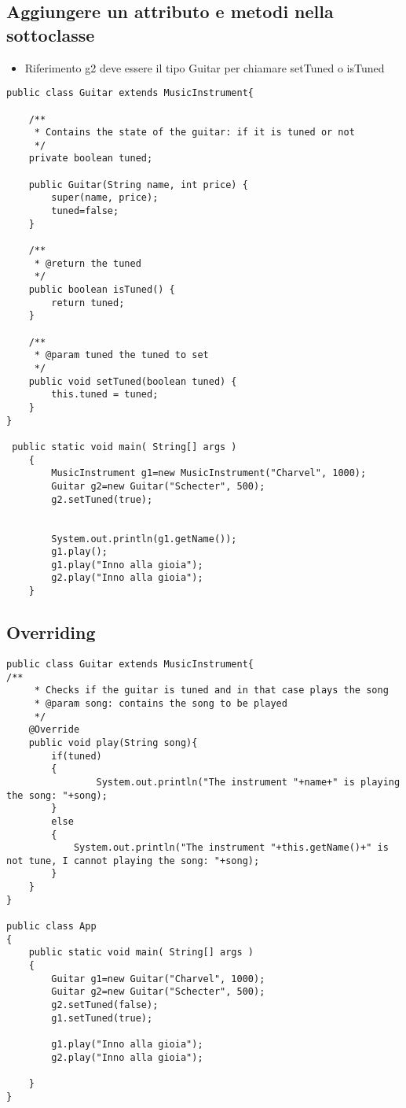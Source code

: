 \documentclass{article}
\begin{document}
\subsection{Aggiungere un attributo e metodi nella sottoclasse}
\begin{itemize}
\item Riferimento g2 deve essere il tipo Guitar per chiamare setTuned
  o isTuned
\end{itemize}
\begin{lstlisting}
public class Guitar extends MusicInstrument{
	
	/**
	 * Contains the state of the guitar: if it is tuned or not
	 */
	private boolean tuned;
	
	public Guitar(String name, int price) {
		super(name, price);
		tuned=false;
	}
	
	/**
	 * @return the tuned
	 */
	public boolean isTuned() {
		return tuned;
	}

	/**
	 * @param tuned the tuned to set
	 */
	public void setTuned(boolean tuned) {
		this.tuned = tuned;
	}
}

 public static void main( String[] args )
    {
    	MusicInstrument g1=new MusicInstrument("Charvel", 1000);
    	Guitar g2=new Guitar("Schecter", 500);
      	g2.setTuned(true);
        
    	
    	System.out.println(g1.getName());
    	g1.play();
    	g1.play("Inno alla gioia");
    	g2.play("Inno alla gioia");
    }
\end{lstlisting}


\subsection{Overriding}
\begin{lstlisting}
public class Guitar extends MusicInstrument{
/**
	 * Checks if the guitar is tuned and in that case plays the song
	 * @param song: contains the song to be played
	 */
	@Override
	public void play(String song){
		if(tuned)
		{
				System.out.println("The instrument "+name+" is playing the song: "+song);
		}
		else
		{
			System.out.println("The instrument "+this.getName()+" is not tune, I cannot playing the song: "+song);
		}
	}
}
	
public class App 
{
    public static void main( String[] args )
    {
    	Guitar g1=new Guitar("Charvel", 1000);
    	Guitar g2=new Guitar("Schecter", 500);
      	g2.setTuned(false);
        g1.setTuned(true);
    	
    	g1.play("Inno alla gioia");
    	g2.play("Inno alla gioia");
    	
    }
}

\end{lstlisting}
\end{document}
